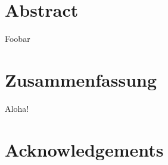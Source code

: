 

\cleardoublepage
\section*{Abstract}
Foobar

\cleardoublepage
\section*{Zusammenfassung}
Aloha!

\cleardoublepage
\section*{Acknowledgements}